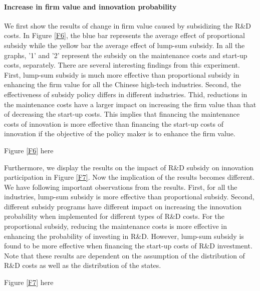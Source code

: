 \documentclass[English]{article}
\begin{document}
\paragraph{Increase in firm value and innovation probability} We first show the results of change in firm value caused by subsidizing the R\&D costs. In Figure \ref{F6}, the blue bar represents the average effect of proportional subsidy while the yellow bar the average effect of lump-sum subsidy. In all the graphs, '1' and '2' represent the subsidy on the maintenance costs and start-up costs, separately. There are several interesting findings from this experiment. First, lump-sum subsidy is much more effective than proportional subsidy in enhancing the firm value for all the Chinese high-tech industries. Second, the effectiveness of subsidy policy differs in different industries. Thid, reductions in the maintenance costs have a larger impact on increasing the firm value than that of decreasing the start-up costs. This implies that financing the maintenance costs of innovation is more effective than financing the start-up costs of innovation if the objective of the policy maker is to enhance the firm value. 

\begin{center}
Figure \ref{F6} here
\end{center}

Furthermore, we display the results on the impact of R\&D subsidy on innovation participation in Figure \ref{F7}. Now the implication of the results becomes different. We have following important observations from the results. First, for all the industries, lump-sum subsidy is more effective than proportional subsidy. Second, different subsidy programs have different impact on increasing the innovation probability when implemented for different types of R\&D costs. For the proportional subsidy, reducing the maintenance costs is more effective in enhancing the probability of investing in R\&D. However, lump-sum subsidy is found to be more effective when financing the start-up costs of R\&D investment. Note that these results are dependent on the assumption of the distribution of R\&D costs as well as the distribution of the states. 

\begin{center}
Figure \ref{F7} here
\end{center}
\end{document}
